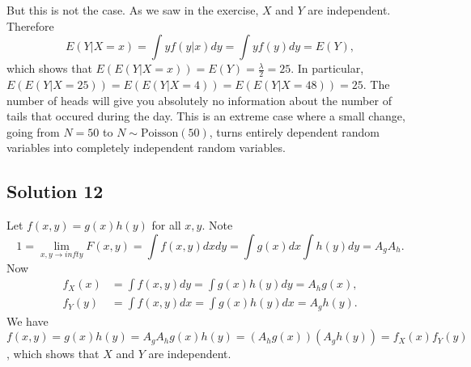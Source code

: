 But this is not the case.
As we saw in the exercise, $X$ and $Y$ are independent.
Therefore
$$
E(Y | X = x) = \int y f(y|x) dy = \int y f(y) dy = E(Y),
$$
which shows that $E(E(Y | X = x)) = E(Y) = \frac{\lambda}{2} = 25$.
In particular, $E(E(Y | X = 25)) = E(E(Y | X = 4)) = E(E(Y | X = 48)) = 25$.
The number of heads will give you absolutely no information about the number of tails that occured during the day.
This is an extreme case where a small change, going from $N = 50$ to $N \sim \mathrm{Poisson}(50)$, turns entirely dependent random variables into completely independent random variables.


\subsection*{Solution 12}

Let $f(x, y) = g(x) h(y)$ for all $x, y$.
Note
$$
1 = \lim_{x, y \to infty} F(x, y) = \int f(x, y) dx dy = \int g(x) dx \int h(y) dy = A_g A_h.
$$
Now
\begin{equation*}
    \begin{split}
        f_X(x) &= \int f(x, y) dy = \int g(x) h(y) dy = A_h g(x), \\
        f_Y(y) &= \int f(x, y) dx = \int g(x) h(y) dx = A_g h(y).
    \end{split}
\end{equation*}
We have $f(x, y) = g(x) h(y) = A_g A_h g(x) h(y) = (A_h g(x))(A_g h(y)) = f_X(x) f_Y(y)$, which shows that $X$ and $Y$ are independent.
